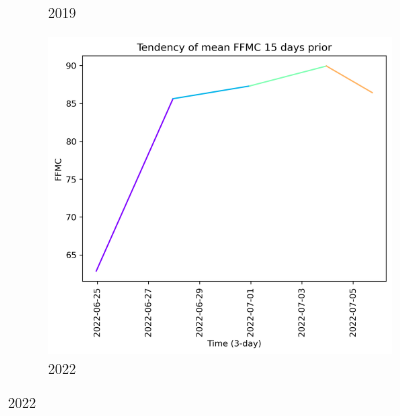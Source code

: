 \begin{figure}[h]
\begin{subfigure}{0.3\textwidth}
        \caption{2019}
        \label{fig:ffmc_prior_15_days_2019}
    \end{subfigure}
    \hfill
    \begin{subfigure}{0.3\textwidth}
        \centering
        \includegraphics[width=\textwidth]{graphs/15days/2022_15daysprior_tendency_graph_FFMC.png}
        \caption{2022}
        \label{fig:ffmc_prior_15_days_2022}
    \end{subfigure}
    
    \label{fig:ffmc_values_15days_prior}
\end{figure}

